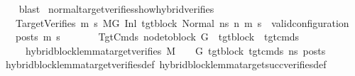 \begin{isabellebody}
\ \ \isamarkupfalse%
\ blast%
\endisatagproof
{\isafoldproof}%
%
\isadelimproof
\isanewline
%
\endisadelimproof
\isanewline
{}\isamarkupfalse%
\ normal{\isacharunderscore}{\kern0pt}target{\isacharunderscore}{\kern0pt}verifies{\isacharunderscore}{\kern0pt}show{\isacharunderscore}{\kern0pt}hybrid{\isacharunderscore}{\kern0pt}verifies{\isacharcolon}{\kern0pt}\isanewline
\ \ \ TargetVerifies{\isacharcolon}{\kern0pt}\ {\isachardoublequoteopen}{\isasymforall}m{}{\isacharprime}{\kern0pt}\ s{}{\isacharprime}{\kern0pt}{\isachardot}{\kern0pt}\ {\isacharparenleft}{\kern0pt}M{\isacharcomma}{\kern0pt}{\isasymLambda}{\isacharcomma}{\kern0pt}{\isasymGamma}{\isacharcomma}{\kern0pt}{\isasymOmega}{\isacharcomma}{\kern0pt}G{\isacharprime}{\kern0pt}\ {\isasymturnstile}{\isacharparenleft}{\kern0pt}Inl\ tgt{\isacharunderscore}{\kern0pt}block{\isacharcomma}{\kern0pt}\ Normal\ ns{\isacharparenright}{\kern0pt}\ {\isacharminus}{\kern0pt}n{\isasymrightarrow}{\isacharasterisk}{\kern0pt}\ {\isacharparenleft}{\kern0pt}m{}{\isacharprime}{\kern0pt}{\isacharcomma}{\kern0pt}\ s{}{\isacharprime}{\kern0pt}{\isacharparenright}{\kern0pt}{\isacharparenright}{\kern0pt}\ {\isasymlongrightarrow}\ valid{\isacharunderscore}{\kern0pt}configuration\ {\isasymLambda}\ {\isasymGamma}\ {\isasymOmega}\ posts\ m{}{\isacharprime}{\kern0pt}\ s{}{\isacharprime}{\kern0pt}{\isachardoublequoteclose}\isanewline
\ \ \ \ \ \ \ TgtCmds{\isacharcolon}{\kern0pt}\ {\isachardoublequoteopen}node{\isacharunderscore}{\kern0pt}to{\isacharunderscore}{\kern0pt}block\ G{\isacharprime}{\kern0pt}\ {\isacharbang}{\kern0pt}\ tgt{\isacharunderscore}{\kern0pt}block\ {\isacharequal}{\kern0pt}\ tgt{\isacharunderscore}{\kern0pt}cmds{\isachardoublequoteclose}\isanewline
\ \ \ \ \ {\isachardoublequoteopen}hybrid{\isacharunderscore}{\kern0pt}block{\isacharunderscore}{\kern0pt}lemma{\isacharunderscore}{\kern0pt}target{\isacharunderscore}{\kern0pt}verifies\ M\ {\isasymLambda}\ {\isasymGamma}\ {\isasymOmega}\ G{\isacharprime}{\kern0pt}\ tgt{\isacharunderscore}{\kern0pt}block\ tgt{\isacharunderscore}{\kern0pt}cmds\ ns\ posts{\isachardoublequoteclose}\isanewline
%
\isadelimproof
\ \ %
\endisadelimproof
%
\isatagproof
{}\isamarkupfalse%
\ hybrid{\isacharunderscore}{\kern0pt}block{\isacharunderscore}{\kern0pt}lemma{\isacharunderscore}{\kern0pt}target{\isacharunderscore}{\kern0pt}verifies{\isacharunderscore}{\kern0pt}def\ hybrid{\isacharunderscore}{\kern0pt}block{\isacharunderscore}{\kern0pt}lemma{\isacharunderscore}{\kern0pt}target{\isacharunderscore}{\kern0pt}succ{\isacharunderscore}{\kern0pt}verifies{\isacharunderscore}{\kern0pt}def\isanewline

\end{isabellebody}
